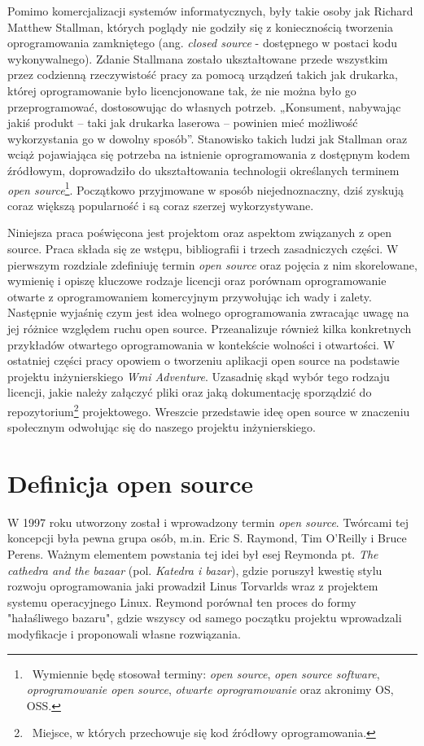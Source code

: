 \documentclass{article}
\begin{document}
Pomimo komercjalizacji systemów informatycznych, były takie osoby jak Richard Matthew Stallman, których poglądy nie godziły się z koniecznością tworzenia oprogramowania zamkniętego (ang. \emph{closed source} - dostępnego w postaci kodu wykonywalnego). Zdanie Stallmana zostało ukształtowane przede wszystkim przez codzienną rzeczywistość pracy za pomocą urządzeń takich jak drukarka, której oprogramowanie było licencjonowane tak, że nie można było go przeprogramować, dostosowując do własnych potrzeb. „Konsument, nabywając jakiś produkt – taki jak drukarka laserowa – powinien mieć możliwość wykorzystania go w dowolny sposób”\cite{Kotula}. Stanowisko takich ludzi jak Stallman oraz wciąż pojawiająca się potrzeba na istnienie oprogramowania z dostępnym kodem źródłowym, doprowadziło do ukształtowania technologii określanych terminem \emph{open source}\footnote{\, Wymiennie będę stosował terminy: \emph{open source}, \emph{open source software}, \emph{oprogramowanie open source}, \emph{otwarte oprogramowanie} oraz akronimy OS, OSS.}. Początkowo przyjmowane w sposób niejednoznaczny, dziś zyskują coraz większą popularność i są coraz szerzej wykorzystywane\cite{Kotula}. 

Niniejsza praca poświęcona jest projektom oraz aspektom związanych z open source. Praca składa się ze wstępu, bibliografii i trzech zasadniczych części. W pierwszym rozdziale zdefiniuję termin \emph{open source} oraz pojęcia z nim skorelowane, wymienię i opiszę kluczowe rodzaje licencji oraz porównam oprogramowanie otwarte z oprogramowaniem komercyjnym przywołując ich wady i zalety. Następnie wyjaśnię czym jest idea wolnego oprogramowania zwracając uwagę na jej różnice względem ruchu open source. Przeanalizuje również kilka konkretnych przykładów otwartego oprogramowania w kontekście wolności i otwartości. W ostatniej części pracy opowiem o tworzeniu aplikacji open source na podstawie projektu inżynierskiego \emph{Wmi Adventure}. Uzasadnię skąd wybór tego rodzaju licencji, jakie należy załączyć pliki oraz jaką dokumentację sporządzić do repozytorium\footnote{\, Miejsce, w których przechowuje się kod źródłowy oprogramowania.} projektowego. Wreszcie przedstawie ideę open source w znaczeniu społecznym odwołując się do naszego projektu inżynierskiego.

\section{Definicja open source}

\hspace{4mm} W 1997 roku utworzony został i wprowadzony termin \emph{open source}. Twórcami tej koncepcji była pewna grupa osób, m.in. Eric S. Raymond, Tim O'Reilly i Bruce Perens. Ważnym elementem powstania tej idei był esej Reymonda pt. \emph{The cathedra and the bazaar} (pol. \emph{Katedra i bazar}), gdzie poruszył kwestię stylu rozwoju oprogramowania jaki prowadził Linus Torvarlds wraz z projektem systemu operacyjnego Linux. Reymond porównał ten proces do formy "hałaśliwego bazaru", gdzie wszyscy od samego początku projektu wprowadzali modyfikacje i proponowali własne rozwiązania\cite{Kotula}.  
\end{document}
